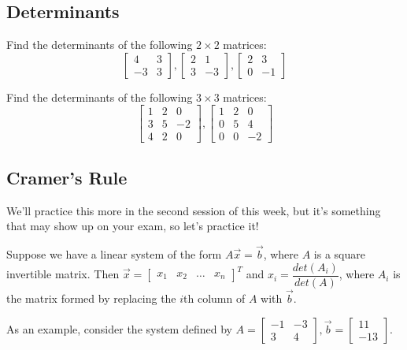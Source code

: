 \documentclass[11pt]{exam}
\begin{document}
    \vspace{20px}
    \subsection{Determinants}
    \begin{questions}
        \item Find the determinants of the following $2 \times 2$ matrices:
        $$\begin{bmatrix} 4 & 3 \\ -3 & 3 \end{bmatrix}, \begin{bmatrix} 2 & 1 \\ 3 & -3 \end{bmatrix}, \begin{bmatrix} 2 & 3 \\ 0 & -1 \end{bmatrix}$$
        \item Find the determinants of the following $3 \times 3$ matrices:
        $$\begin{bmatrix} 1 & 2 & 0 \\ 3 & 5 & -2 \\ 4 & 2 & 0 \end{bmatrix}, \begin{bmatrix} 1 & 2 & 0 \\ 0 & 5 & 4 \\ 0 & 0 & -2 \end{bmatrix}$$
    \end{questions}

    \pagebreak
    \subsection{Cramer's Rule}
    We'll practice this more in the second session of this week, but it's something that may show up on your exam, so let's practice it!

    Suppose we have a linear system of the form $A\vec{x} = \vec{b}$, where $A$ is a square invertible matrix.
    Then $\vec{x} = \begin{bmatrix} x_1 & x_2 & \dots & x_n \end{bmatrix}^T$ and $x_i = \dfrac{det(A_i)}{det(A)}$, where $A_i$ is the matrix
    formed by replacing the $i$th column of $A$ with $\vec{b}$.

    As an example, consider the system defined by $A = \begin{bmatrix} -1 & -3 \\ 3 & 4 \end{bmatrix},
    \vec{b} = \begin{bmatrix} 11 \\ -13 \end{bmatrix}$.
\end{document}
